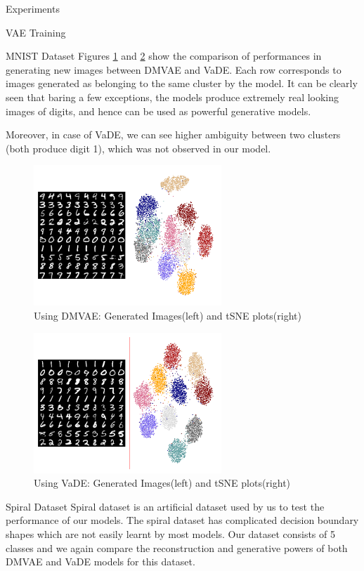 \documentclass{article}
\begin{document}
\begin{psection}{Experiments}
\begin{psubsection}{VAE Training}
\begin{pssubsection}{MNIST Dataset}
			Figures \ref{fig:dmvae_mnist_sampled} and \ref{fig:vade_mnist_sampled} show the comparison of performances in generating new images between DMVAE and VaDE. Each row corresponds to images generated as belonging to the same cluster by the model. It can be clearly seen that baring a few exceptions, the models produce extremely real looking images of digits, and hence can be used as powerful generative models.

			Moreover, in case of VaDE, we can see higher ambiguity between two clusters (both produce digit 1), which was not observed in our model.
			\begin{figure}[H]
				\centering
				\includegraphics[height=200px]{includes/plots/dmvae/mnist/sampled.png}
				\caption{Using DMVAE: Generated Images(left) and tSNE plots(right)}
				\label{fig:dmvae_mnist_sampled}
			\end{figure}
			\begin{figure}[H]
				\centering
				\includegraphics[height=200px]{includes/plots/vade/mnist/sampled.png}
				\caption{Using VaDE: Generated Images(left) and tSNE plots(right)}
				\label{fig:vade_mnist_sampled}
			\end{figure}

		\end{pssubsection}
		\begin{pssubsection}{Spiral Dataset}
			Spiral dataset is an artificial dataset used by us to test the performance of our models. The spiral dataset has complicated decision boundary shapes which are not easily learnt by most models. Our dataset consists of 5 classes and we again compare the reconstruction and generative powers of both DMVAE and VaDE models for this dataset.


\end{pssubsection}
\end{psubsection}
\end{psection}
\end{document}
